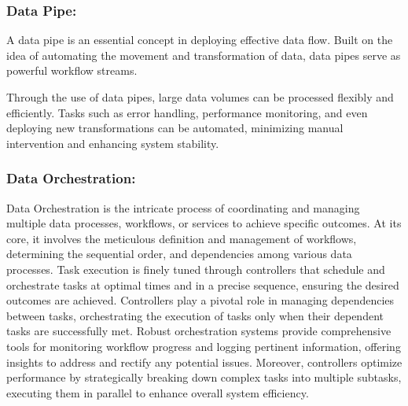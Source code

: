 \subsubsection*{Data Pipe:}

A data pipe is an essential concept in deploying effective data flow. Built on
the idea of automating the movement and transformation of data, data pipes serve
as powerful workflow streams.

Through the use of data pipes, large data volumes can be processed flexibly and
efficiently. Tasks such as error handling, performance monitoring, and even
deploying new transformations can be automated, minimizing manual intervention
and enhancing system stability.


\subsubsection*{Data Orchestration:}

Data Orchestration is the intricate process of coordinating and managing
multiple data processes, workflows, or services to achieve specific outcomes. At
its core, it involves the meticulous definition and management of workflows,
determining the sequential order, and dependencies among various data processes.
Task execution is finely tuned through controllers that schedule and orchestrate
tasks at optimal times and in a precise sequence, ensuring the desired outcomes
are achieved. Controllers play a pivotal role in managing dependencies between
tasks, orchestrating the execution of tasks only when their dependent tasks are
successfully met. Robust orchestration systems provide comprehensive tools for
monitoring workflow progress and logging pertinent information, offering
insights to address and rectify any potential issues. Moreover, controllers
optimize performance by strategically breaking down complex tasks into multiple
subtasks, executing them in parallel to enhance overall system efficiency.
